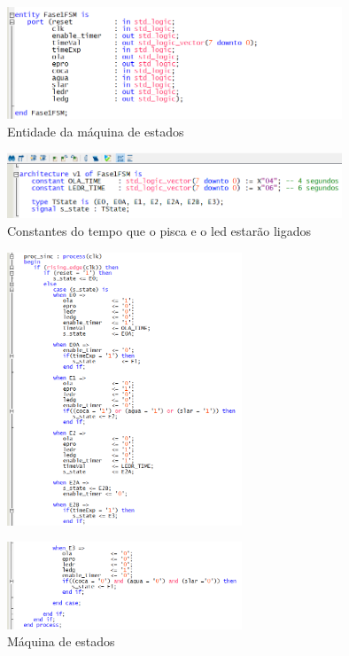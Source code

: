 \documentclass{report}
\begin{document}
\begin{figure}[H]
    \centering
    \includegraphics[width = 10cm]{Fase1FSMentity.png}
    \caption{Entidade da máquina de estados}
    \label{fig:entityMáquinadeestados}
\end{figure}

\begin{figure}[H]
    \centering
    \includegraphics[width = 10cm]{Time.png}
    \caption{Constantes do tempo que o pisca e o led estarão ligados}
    \label{fig:Time}
\end{figure}

\begin{figure}[H]
    \centering
    \includegraphics[width = 7cm]{Fase1FSM.png}
    \label{fig:FSM}
\end{figure}

\begin{figure}[H]
    \centering
    \includegraphics[width = 7cm]{Fase1FSME3.png}
    \caption{Máquina de estados}
    \label{fig:Estado3}
\end{figure}
\end{document}
